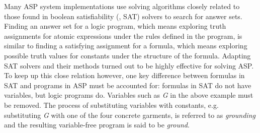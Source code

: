 \documentclass{vutinfth} %
\begin{document}

Many ASP system implementations use solving algorithms closely related to those found in boolean satisfiability (\cite{sat}, SAT) solvers to search for answer sets. Finding an answer set for a logic program, which means exploring truth assignments for atomic expressions under the rules defined in the program, is similar to finding a satisfying assignment for a formula, which means exploring possible truth values for constants under the structure of the formula. Adapting SAT solvers and their methods turned out to be highly effective for solving ASP. To keep up this close relation however, one key difference between formulas in SAT and programs in ASP must be accounted for: formulas in SAT do not have variables, but logic programs do. Variables such as \emph{G} in the above example must be removed. The process of substituting variables with constants, e.g. substituting \emph{G} with one of the four concrete garments, is referred to as \emph{grounding} and the resulting variable-free program is said to be \emph{ground}.
\end{document}
